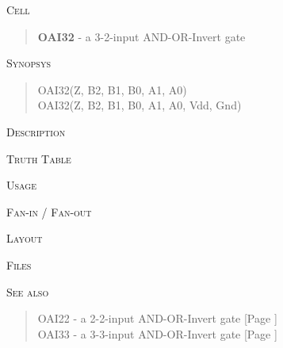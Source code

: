 
\label{OAI32}
\textsc{Cell}
\begin{quote}
    \textbf{OAI32} - a 3-2-input AND-OR-Invert gate
\end{quote}

\textsc{Synopsys}
\begin{quote}
    OAI32(Z, B2, B1, B0, A1, A0) \\
    OAI32(Z, B2, B1, B0, A1, A0, Vdd, Gnd)
\end{quote}

\textsc{Description}

%

\textsc{Truth Table}


\textsc{Usage}

\textsc{Fan-in / Fan-out}

\textsc{Layout}

\textsc{Files}

\textsc{See also}
\begin{quote}
    OAI22 - a 2-2-input AND-OR-Invert gate [Page \pageref{OAI22}] \\
    OAI33 - a 3-3-input AND-OR-Invert gate [Page \pageref{OAI33}]
\end{quote}
